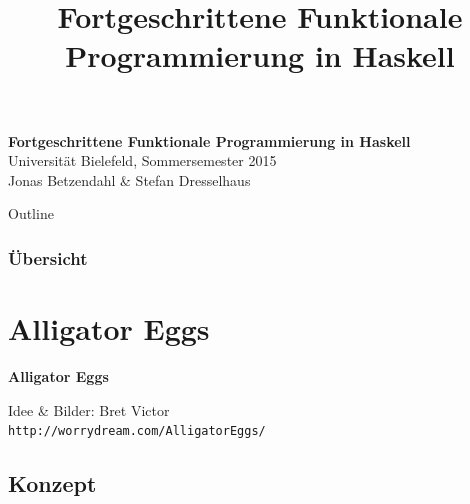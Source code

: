 \documentclass{beamer}
\title{Fortgeschrittene Funktionale Programmierung in Haskell}
\begin{document}
  

  \begin{frame}
  \begin{center}
    \huge\textbf{Fortgeschrittene Funktionale Programmierung in Haskell}\\ \bigskip
    \LARGE Universität Bielefeld, Sommersemester 2015\\ \bigskip
    \large Jonas Betzendahl \& Stefan Dresselhaus
    \end{center}
  \end{frame}


\begin{frame}[allowframebreaks]{Outline}
\frametitle{Übersicht}
\tableofcontents
\end{frame}

\section*{Alligator Eggs}

\begin{frame}

\begin{center}
\Large \textbf{Alligator Eggs} \tiny \bigskip

Idee \& Bilder: Bret Victor\\
\texttt{http://worrydream.com/AlligatorEggs/}
\end{center}

\end{frame}

\subsection*{Konzept}
\end{document}
